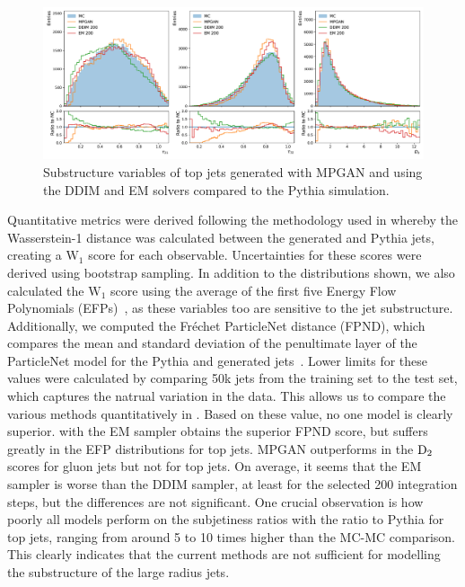 \begin{figure}[hbpt]
    \centering
    \includegraphics[width=1.\linewidth]{Figures/jet_generation/jedi/gluon/jet_substructure_rel.pdf}
    \caption{Substructure variables of top jets generated with MPGAN and \pcjedi using the DDIM and EM solvers compared to the Pythia simulation.}
    \label{fig:substructure_top}
\end{figure}

Quantitative metrics were derived following the methodology used in \textcite{MPGAN} whereby the Wasserstein-1 distance was calculated between the generated and Pythia jets, creating a $\text{W}_1$ score for each observable.
Uncertainties for these scores were derived using bootstrap sampling.
In addition to the distributions shown, we also calculated the $\text{W}_1$ score using the average of the first five Energy Flow Polynomials (EFPs)~\cite{EFP}, as these variables too are sensitive to the jet substructure.
Additionally, we computed the Fréchet ParticleNet distance (FPND), which compares the mean and standard deviation of the penultimate layer of the ParticleNet model for the Pythia and generated jets~\cite{MPGAN, ParticleNet}.
Lower limits for these values were calculated by comparing 50k jets from the training set to the test set, which captures the natrual variation in the data.
This allows us to compare the various methods quantitatively in .
Based on these value, no one model is clearly superior.
\pcjedi with the EM sampler obtains the superior FPND score, but suffers greatly in the EFP distributions for top jets.
MPGAN outperforms \pcjedi in the $\text{D}_2$ scores for gluon jets but not for top jets.
On average, it seems that the EM sampler is worse than the DDIM sampler, at least for the selected 200 integration steps, but the differences are not significant.
One crucial observation is how poorly all models perform on the subjetiness ratios with the ratio to Pythia for top jets, ranging from around 5 to 10 times higher than the MC-MC comparison.
This clearly indicates that the current methods are not sufficient for modelling the substructure of the large radius jets.

